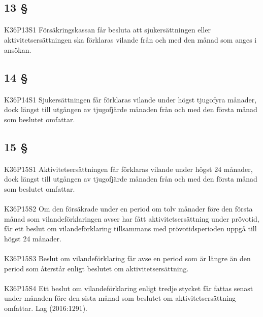 \documentclass[a4paper,notitlepage,openany,10pt]{book}
\begin{document}
\subsection*{13 §}
\paragraph*{}
{\tiny K36P13S1}
Försäkringskassan får besluta att sjukersättningen eller aktivitetsersättningen ska förklaras vilande från och med den månad som anges i ansökan.
\subsection*{14 §}
\paragraph*{}
{\tiny K36P14S1}
Sjukersättningen får förklaras vilande under högst tjugofyra månader, dock längst till utgången av tjugofjärde månaden från och med den första månad som beslutet omfattar.
\subsection*{15 §}
\paragraph*{}
{\tiny K36P15S1}
Aktivitetsersättningen får förklaras vilande under högst 24 månader, dock längst till utgången av tjugofjärde månaden från och med den första månad som beslutet omfattar.
\paragraph*{}
{\tiny K36P15S2}
Om den försäkrade under en period om tolv månader före den första månad som vilandeförklaringen avser har fått aktivitetsersättning under prövotid, får ett beslut om vilandeförklaring tillsammans med prövotidsperioden uppgå till högst 24 månader.
\paragraph*{}
{\tiny K36P15S3}
Beslut om vilandeförklaring får avse en period som är längre än den period som återstår enligt beslutet om aktivitetsersättning.
\paragraph*{}
{\tiny K36P15S4}
Ett beslut om vilandeförklaring enligt tredje stycket får fattas senast under månaden före den sista månad som beslutet om aktivitetsersättning omfattar.
Lag (2016:1291).
\end{document}
